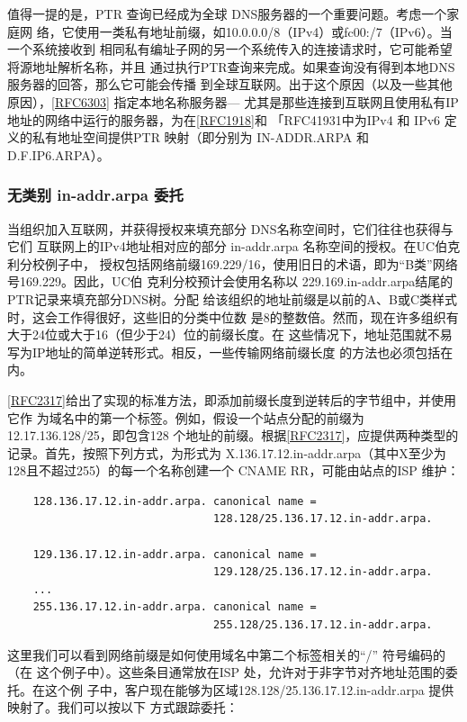 值得一提的是，PTR 查询已经成为全球 DNS服务器的一个重要问题。考虑一个家庭网
络，它使用一类私有地址前缀，如10.0.0.0/8（IPv4）或fc00:/7（IPv6）。当一个系统接收到
相同私有编址子网的另一个系统传入的连接请求时，它可能希望将源地址解析名称，并且
通过执行PTR查询来完成。如果查询没有得到本地DNS服务器的回答，那么它可能会传播
到全球互联网。出于这个原因（以及一些其他原因），\href{https://www.rfc-editor.org/rfc/rfc6303}{[RFC6303]} 指定本地名称服务器—
尤其是那些连接到互联网且使用私有IP地址的网络中运行的服务器，为在\href{https://www.rfc-editor.org/rfc/rfc1918}{[RFC1918]}和
「RFC41931中为IPv4 和 IPv6 定义的私有地址空间提供PTR 映射（即分别为 IN-ADDR.ARPA
和 D.F.IP6.ARPA）。

\subsubsection{无类别 in-addr.arpa 委托}

当组织加入互联网，并获得授权来填充部分 DNS名称空间时，它们往往也获得与它们
互联网上的IPv4地址相对应的部分 in-addr.arpa 名称空间的授权。在UC伯克利分校例子中，
授权包括网络前缀169.229/16，使用旧日的术语，即为“B类”网络号169.229。因此，UC伯
克利分校预计会使用名称以 229.169.in-addr.arpa结尾的PTR记录来填充部分DNS树。分配
给该组织的地址前缀是以前的A、B或C类样式时，这会工作得很好，这些旧的分类中位数
是8的整数倍。然而，现在许多组织有大于24位或大于16（但少于24）位的前缀长度。在
这些情况下，地址范围就不易写为IP地址的简单逆转形式。相反，一些传输网络前缀长度
的方法也必须包括在内。

\href{https://www.rfc-editor.org/rfc/rfc2317}{[RFC2317]}给出了实现的标准方法，即添加前缀长度到逆转后的字节组中，并使用它作
为域名中的第一个标签。例如，假设一个站点分配的前缀为12.17.136.128/25，即包含128
个地址的前缀。根据\href{https://www.rfc-editor.org/rfc/rfc2317}{[RFC2317]}，应提供两种类型的记录。首先，按照下列方式，为形式为
X.136.17.12.in-addr.arpa（其中X至少为128且不超过255）的每一个名称创建一个 CNAME
RR，可能由站点的ISP 维护：

\begin{verbatim}
    128.136.17.12.in-addr.arpa. canonical name =
                                128.128/25.136.17.12.in-addr.arpa.

    129.136.17.12.in-addr.arpa. canonical name =
                                129.128/25.136.17.12.in-addr.arpa.
    ...
    255.136.17.12.in-addr.arpa. canonical name =
                                255.128/25.136.17.12.in-addr.arpa.
\end{verbatim}

这里我们可以看到网络前缀是如何使用域名中第二个标签相关的“/” 符号编码的（在
这个例子中）。这些条目通常放在ISP 处，允许对于非字节对齐地址范围的委托。在这个例
子中，客户现在能够为区域128.128/25.136.17.12.in-addr.arpa 提供映射了。我们可以按以下
方式跟踪委托：

